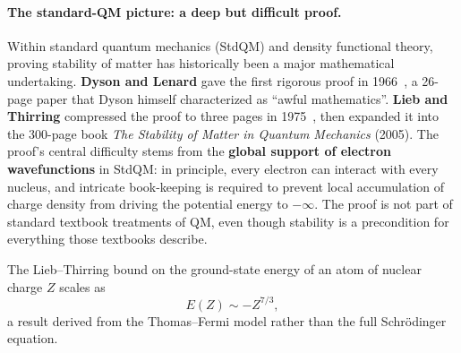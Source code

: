 \documentclass[11pt]{article}
\begin{document}
\paragraph{The standard-QM picture: a deep but difficult proof.}
Within standard quantum mechanics (StdQM) and density functional theory, proving stability of matter has historically been a major mathematical undertaking. \textbf{Dyson and Lenard} gave the first rigorous proof in 1966~\cite{DysonLenard67}, a 26-page paper that Dyson himself characterized as ``awful mathematics''. \textbf{Lieb and Thirring} compressed the proof to three pages in 1975~\cite{LiebThirring75}, then expanded it into the 300-page book \emph{The Stability of Matter in Quantum Mechanics} (2005). The proof's central difficulty stems from the \textbf{global support of electron wavefunctions} in StdQM: in principle, every electron can interact with every nucleus, and intricate book-keeping is required to prevent local accumulation of charge density from driving the potential energy to $-\infty$. The proof is not part of standard textbook treatments of QM, even though stability is a precondition for everything those textbooks describe.

The Lieb--Thirring bound on the ground-state energy of an atom of nuclear charge $Z$ scales as
\begin{equation}
E(Z) \sim -Z^{7/3},
\end{equation}
a result derived from the Thomas--Fermi model rather than the full Schr\"odinger equation.
\end{document}

